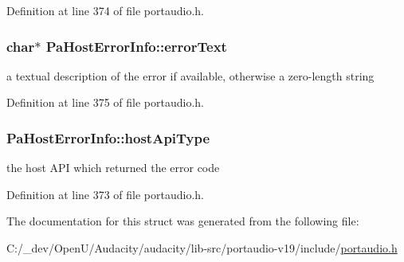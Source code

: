 Definition at line 374 of file portaudio.\+h.

\subsubsection[{\texorpdfstring{error\+Text}{errorText}}]{ char$\ast$ Pa\+Host\+Error\+Info\+::error\+Text}\hypertarget{struct_pa_host_error_info_aa40a7ed0c73b85b39563d80f7877876c}{}\label{struct_pa_host_error_info_aa40a7ed0c73b85b39563d80f7877876c}
a textual description of the error if available, otherwise a zero-\/length string 

Definition at line 375 of file portaudio.\+h.

\subsubsection[{\texorpdfstring{host\+Api\+Type}{hostApiType}}]{ Pa\+Host\+Error\+Info\+::host\+Api\+Type}\hypertarget{struct_pa_host_error_info_aeadfc0e22fee75e94541876d6d7a91f7}{}\label{struct_pa_host_error_info_aeadfc0e22fee75e94541876d6d7a91f7}
the host A\+PI which returned the error code 

Definition at line 373 of file portaudio.\+h.



The documentation for this struct was generated from the following file\+:\begin{DoxyCompactItemize}
\item 
C\+:/\+\_\+dev/\+Open\+U/\+Audacity/audacity/lib-\/src/portaudio-\/v19/include/\hyperlink{portaudio_8h}{portaudio.\+h}\end{DoxyCompactItemize}
